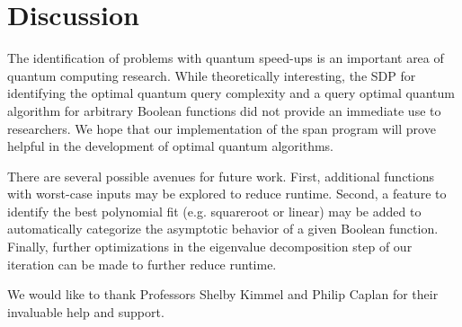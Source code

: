 \section{Discussion}
The identification of problems with
quantum speed-ups is an important area
of quantum computing research.
While theoretically interesting,
the SDP for identifying the optimal quantum query
complexity and a query optimal quantum algorithm
for arbitrary Boolean functions did not provide
an immediate use to researchers.
We hope that our implementation of the span program
will prove helpful in the development of
optimal quantum algorithms.

There are several possible avenues for future work.
First, additional functions with worst-case
inputs may be explored to reduce runtime.
Second, a feature to identify the best polynomial
fit (e.g. squareroot or linear) may be added
to automatically categorize the asymptotic behavior
of a given Boolean function.
Finally, further optimizations in the
eigenvalue decomposition step of our iteration
can be made to further reduce runtime.

\begin{acks}
We would like to thank Professors Shelby Kimmel
and Philip Caplan for their invaluable help and support. 
\end{acks}